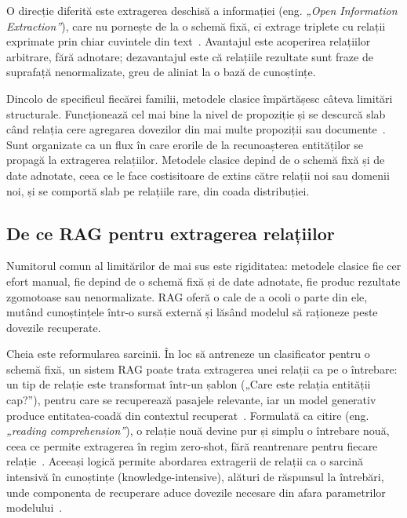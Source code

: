 O direcție diferită este extragerea deschisă a informației (eng. \textit{„Open Information Extraction”}), care nu pornește de la o schemă fixă, ci extrage triplete cu relații exprimate prin chiar cuvintele din text~\cite{banko2007openie}. Avantajul este acoperirea relațiilor arbitrare, fără adnotare; dezavantajul este că relațiile rezultate sunt fraze de suprafață nenormalizate, greu de aliniat la o bază de cunoștințe.

Dincolo de specificul fiecărei familii, metodele clasice împărtășesc câteva limitări structurale. Funcționează cel mai bine la nivel de propoziție și se descurcă slab când relația cere agregarea dovezilor din mai multe propoziții sau documente~\cite{yao2019docred}. Sunt organizate ca un flux în care erorile de la recunoașterea entităților se propagă la extragerea relațiilor. Metodele clasice depind de o schemă fixă și de date adnotate, ceea ce le face costisitoare de extins către relații noi sau domenii noi, și se comportă slab pe relațiile rare, din coada distribuției.

\subsection{De ce RAG pentru extragerea relațiilor}

Numitorul comun al limitărilor de mai sus este rigiditatea: metodele clasice fie cer efort manual, fie depind de o schemă fixă și de date adnotate, fie produc rezultate zgomotoase sau nenormalizate. RAG oferă o cale de a ocoli o parte din ele, mutând cunoștințele într-o sursă externă și lăsând modelul să raționeze peste dovezile recuperate.

Cheia este reformularea sarcinii. În loc să antreneze un clasificator pentru o schemă fixă, un sistem RAG poate trata extragerea unei relații ca pe o întrebare: un tip de relație este transformat într-un șablon („Care este {relația} entității {cap}?”), pentru care se recuperează pasajele relevante, iar un model generativ produce entitatea-coadă din contextul recuperat~\cite{levy2017zeroshot}. Formulată ca citire (eng. \textit{„reading comprehension”}), o relație nouă devine pur și simplu o întrebare nouă, ceea ce permite extragerea în regim zero-shot, fără reantrenare pentru fiecare relație~\cite{levy2017zeroshot}. Aceeași logică permite abordarea extragerii de relații ca o sarcină intensivă în cunoștințe (knowledge-intensive), alături de răspunsul la întrebări, unde componenta de recuperare aduce dovezile necesare din afara parametrilor modelului~\cite{lewis2020rag}.

